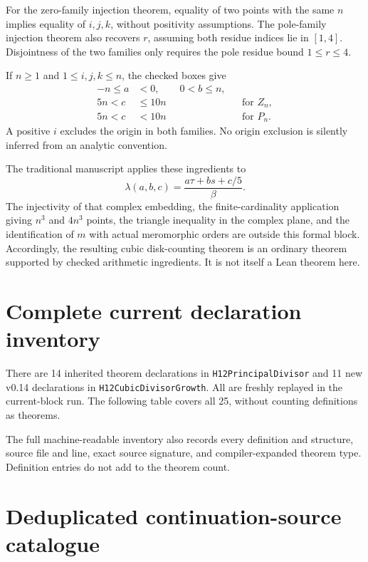 \documentclass[11pt]{article}
\newcommand{\decl}[1]{\nolinkurl{#1}}
\begin{document}
For the zero-family injection theorem, equality of two points with the same \(n\) implies equality of \(i,j,k\), without positivity assumptions. The pole-family injection theorem also recovers \(r\), assuming both residue indices lie in \([1,4]\). Disjointness of the two families only requires the pole residue bound \(1\le r\le4\).

If \(n\ge1\) and \(1\le i,j,k\le n\), the checked boxes give
\begin{align*}
 -n\le a&<0,\qquad 0<b\le n,\\[6pt]
 5n<c&\le10n &&\text{for }Z_n,\\[6pt]
 5n<c&<10n &&\text{for }P_n.
\end{align*}
A positive \(i\) excludes the origin in both families. No origin exclusion is silently inferred from an analytic convention.

The traditional manuscript applies these ingredients to
\[
 \lambda(a,b,c)=\frac{a\tau+bs+c/5}{\beta}.
\]
The injectivity of that complex embedding, the finite-cardinality application giving \(n^3\) and \(4n^3\) points, the triangle inequality in the complex plane, and the identification of \(m\) with actual meromorphic orders are outside this formal block. Accordingly, the resulting cubic disk-counting theorem is an ordinary theorem supported by checked arithmetic ingredients. It is not itself a Lean theorem here.

\clearpage
\section{Complete current declaration inventory}

There are 14 inherited theorem declarations in \decl{H12PrincipalDivisor} and 11 new v0.14 declarations in \decl{H12CubicDivisorGrowth}. All are freshly replayed in the current-block run. The following table covers all 25, without counting definitions as theorems.



The full machine-readable inventory also records every definition and structure, source file and line, exact source signature, and compiler-expanded theorem type. Definition entries do not add to the theorem count.

\clearpage
\section{Deduplicated continuation-source catalogue}
\end{document}

